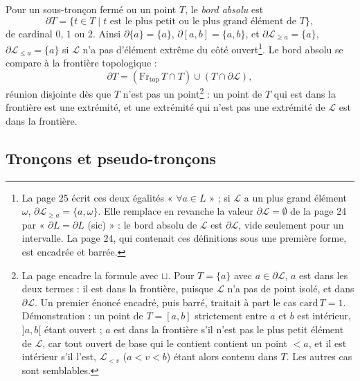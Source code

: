 \documentclass[11pt,a4paper]{article}
\begin{document}
Pour un sous-tronçon fermé ou un point $T$, le \emph{bord absolu} est
\[
\partial T = \{t \in T \mid t \text{ est le plus petit ou le plus grand élément
de } T\},
\]
de cardinal $0$, $1$ ou $2$. Ainsi $\partial \{a\} = \{a\}$, $\partial [a,b] =
\{a,b\}$, et $\partial \mathcal{L}_{\geq a} = \{a\}$, $\partial
\mathcal{L}_{\leq a} = \{a\}$ si $\mathcal{L}$ n'a pas d'élément extrême du côté
ouvert\footnote{La page 25 écrit ces deux égalités « $\forall a \in L$ » ; si
$\mathcal{L}$ a un plus grand élément $\omega$, $\partial \mathcal{L}_{\geq a} =
\{a, \omega\}$. Elle remplace en revanche la valeur $\partial \mathcal{L} =
\emptyset$ de la page 24 par « $\partial L = \partial L$ (sic) » : le bord absolu
de $\mathcal{L}$ est $\partial \mathcal{L}$, vide seulement pour un intervalle.
La page 24, qui contenait ces définitions sous une première forme, est encadrée
et barrée.}. Le bord absolu se compare à la frontière topologique :
\[
\partial T = (\mathrm{Fr}_{\mathrm{top}}\, T \cap T) \cup (T \cap \partial
\mathcal{L}),
\]
réunion disjointe dès que $T$ n'est pas un point\footnote{La page encadre la
formule avec $\sqcup$. Pour $T = \{a\}$ avec $a \in \partial \mathcal{L}$, $a$
est dans les deux termes : il est dans la frontière, puisque $\mathcal{L}$ n'a
pas de point isolé, et dans $\partial \mathcal{L}$. Un premier énoncé encadré,
puis barré, traitait à part le cas $\mathrm{card}\, T = 1$. Démonstration : un
point de $T = [a,b]$ strictement entre $a$ et $b$ est intérieur, $]a,b[$ étant
ouvert ; $a$ est dans la frontière s'il n'est pas le plus petit élément de
$\mathcal{L}$, car tout ouvert de base qui le contient contient un point
$< a$, et il est intérieur s'il l'est, $\mathcal{L}_{<v}$ ($a < v < b$) étant
alors contenu dans $T$. Les autres cas sont semblables.} : un point de $T$ qui
est dans la frontière est une extrémité, et une extrémité qui n'est pas une
extrémité de $\mathcal{L}$ est dans la frontière.

\subsection*{Tronçons et pseudo-tronçons}
\end{document}
